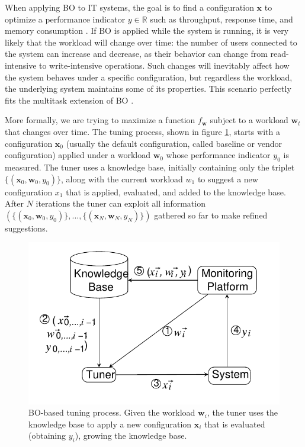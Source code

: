 \documentclass[a4paper, 12pt]{article} %
\begin{document}
	When applying BO to IT systems, the goal is to find a configuration $\pmb{x}$ to optimize a performance indicator $y \in \mathbb{R}$ such as throughput, response time, and memory consumption \cite{AkamasCGP}. If BO is applied while the system is running, it is very likely that the workload will change over time: the number of users connected to the system can increase and decrease, as their behavior can change from read-intensive to write-intensive operations. Such changes will inevitably affect how the system behaves under a specific configuration, but regardless the workload, the underlying system maintains some of its properties. This scenario perfectly fits the multitask extension of BO \cite{CGPBanditOptimization}.
	
	More formally, we are trying to maximize a function $f_{\pmb{w}}$ subject to a workload $\pmb{w}_t$ that changes over time. The tuning process, shown in figure \ref{fig:cgp_it_sys}, starts with a configuration $\pmb{x}_0$ (usually the default configuration, called baseline or vendor configuration) applied under a workload $\pmb{w}_0$ whose performance indicator $y_0$ is measured. The tuner uses a knowledge base, initially containing only the triplet $\{(\pmb{x}_0, \pmb{w}_0, y_0)\}$, along with the current workload $w_1$ to suggest a new configuration $x_1$ that is applied, evaluated, and added to the knowledge base. After $N$ iterations the tuner can exploit all information $(\{(\pmb{x}_0, \pmb{w}_0, y_0)\}, ..., \{(\pmb{x}_N, \pmb{w}_N, y_N)\})$ gathered so far to make refined suggestions.
	\begin{figure} \label{fig:cgp_it_sys}
		\includegraphics[width=\linewidth]{img/cgp_it_sys.png}
		\caption{BO-based tuning process. Given the workload $\pmb{w}_i$, the tuner uses the knowledge base to apply a new configuration $\pmb{x}_i$ that is evaluated (obtaining $y_i$), growing the knowledge base.}
	\end{figure}
	
\end{document}
